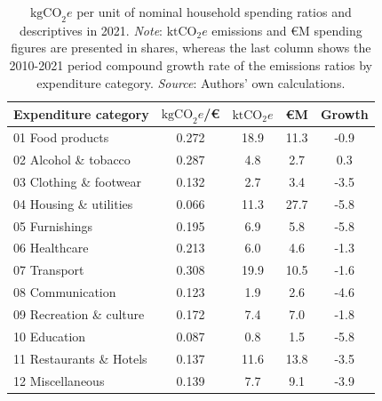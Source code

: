 \documentclass[
  10pt,
  twocolumn]{aft}
\begin{document}
\begin{table}[!h]
\centering\begingroup\fontsize{8}{9}\selectfont
\begin{tabular}[t]{lcccc}
\toprule
Expenditure category & $\text{kgCO}_2e$/\euro{} & $\text{ktCO}_2e$ & \euro{M} & Growth \\
\midrule
01 Food products & 0.272 & 18.9 & 11.3 & -0.9\\
02 Alcohol \& tobacco & 0.287 & 4.8 & 2.7 & 0.3\\
03 Clothing \& footwear & 0.132 & 2.7 & 3.4 & -3.5\\
04 Housing \& utilities & 0.066 & 11.3 & 27.7 & -5.8\\
05 Furnishings & 0.195 & 6.9 & 5.8 & -5.8\\
06 Healthcare & 0.213 & 6.0 & 4.6 & -1.3\\
07 Transport & 0.308 & 19.9 & 10.5 & -1.6\\
08 Communication & 0.123 & 1.9 & 2.6 & -4.6\\
09 Recreation \& culture & 0.172 & 7.4 & 7.0 & -1.8\\
10 Education & 0.087 & 0.8 & 1.5 & -5.8\\
11 Restaurants \& Hotels & 0.137 & 11.6 & 13.8 & -3.5\\
12 Miscellaneous & 0.139 & 7.7 & 9.1 & -3.9\\
\bottomrule
\end{tabular}
\endgroup{}
\caption{$\text{kgCO}_2e$ per unit of nominal household spending ratios and descriptives in 2021. \textit{Note}: $\text{ktCO}_2e$ emissions and \euro{M} spending figures are presented in shares, whereas the last column shows the 2010-2021 period compound growth rate of the emissions ratios by expenditure category. \textit{Source}: Authors’ own calculations.\label{tab:spending-intensity}}
\end{table}
\end{document}
